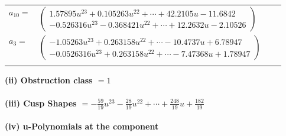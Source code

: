\documentclass[1p]{elsarticle_modified}
\theoremstyle{definition}
\begin{document}
\begin{tabular}{m{7pt} m{180pt} m{7pt} m{180pt} }
\flushright $a_{10}=$&$\begin{pmatrix}1.57895 u^{23}+0.105263 u^{22}+\cdots+42.2105 u-11.6842\\-0.526316 u^{23}-0.368421 u^{22}+\cdots+12.2632 u-2.10526\end{pmatrix}$ \\
\flushright $a_{3}=$&$\begin{pmatrix}-1.05263 u^{23}+0.263158 u^{22}+\cdots-10.4737 u+6.78947\\-0.0526316 u^{23}+0.263158 u^{22}+\cdots-7.47368 u+1.78947\end{pmatrix}$\\&\end{tabular}
\flushleft \textbf{(ii) Obstruction class $= 1$}\\~\\
\flushleft \textbf{(iii) Cusp Shapes $= -\frac{59}{19} u^{23}-\frac{28}{19} u^{22}+\cdots+\frac{248}{19} u+\frac{182}{19}$}\\~\\
\newpage\renewcommand{\arraystretch}{1}
\flushleft \textbf{(iv) u-Polynomials at the component}\newline \\
\end{document}
